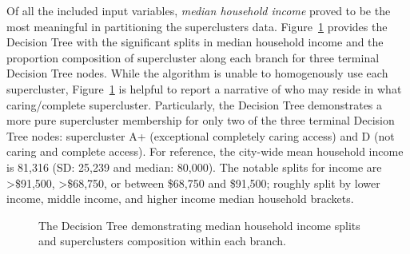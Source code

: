 \documentclass[
  authoryear,
  preprint,
  3p]{elsarticle}
\begin{document}
Of all the included input variables, \emph{median household income}
proved to be the most meaningful in partitioning the superclusters data.
Figure~\ref{fig-Fig9} provides the Decision Tree with the significant
splits in median household income and the proportion composition of
supercluster along each branch for three terminal Decision Tree nodes.
While the algorithm is unable to homogenously use each supercluster,
Figure~\ref{fig-Fig9} is helpful to report a narrative of who may reside
in what caring/complete supercluster. Particularly, the Decision Tree
demonstrates a more pure supercluster membership for only two of the
three terminal Decision Tree nodes: supercluster A+ (exceptional
completely caring access) and D (not caring and complete access). For
reference, the city-wide mean household income is 81,316 (SD: 25,239 and
median: 80,000). The notable splits for income are \textgreater\$91,500,
\textgreater\$68,750, or between \$68,750 and \$91,500; roughly split by
lower income, middle income, and higher income median household
brackets.

\begin{figure}


\caption{\label{fig-Fig9}The Decision Tree demonstrating median
household income splits and superclusters composition within each
branch.}

\end{figure}%
\end{document}

